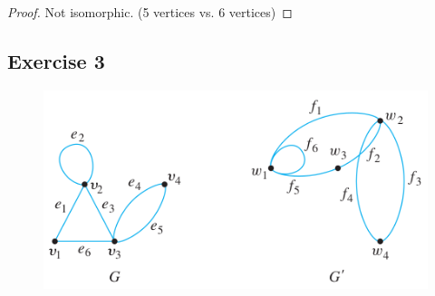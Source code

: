 \documentclass[14pt]{extarticle}
\begin{document}
\begin{proof}
    Not isomorphic. (5 vertices vs. 6 vertices)
\end{proof}

\subsection{Exercise 3}
\begin{figure}[ht!]
    \centering
    \includegraphics[scale=0.55]{../images/10.3.3.png}
\end{figure}
\end{document}
